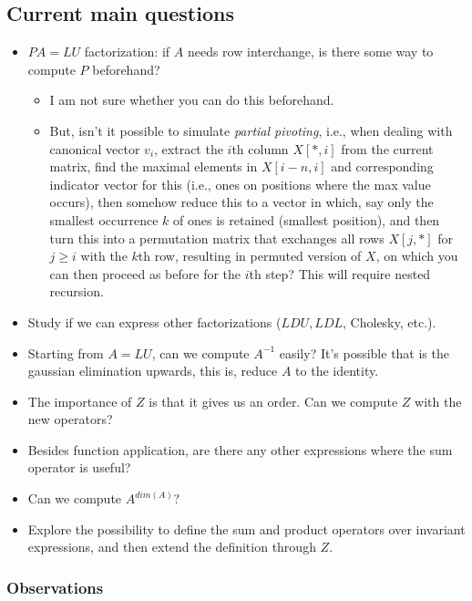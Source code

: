 \subsection*{Current main questions}
\begin{itemize}

\item $PA=LU$ factorization: if $A$ needs row interchange, is there some way to compute $P$ beforehand?
\begin{itemize}
\item I am not sure whether you can do this beforehand.
\item But, isn't it possible to simulate \emph{partial pivoting}, i.e., when dealing with canonical vector $v_i$, extract the $i$th column $X[*,i]$ from the current
matrix, find the maximal elements in $X[i-n,i]$ and corresponding indicator vector for this (i.e., ones on positions where the max value occurs), then somehow
reduce this to a vector in which, say only the smallest occurrence $k$ of ones is retained (smallest position), and then turn this into a permutation matrix that exchanges
all rows $X[j,*]$ for $j\geq i$ with the $k$th row, resulting in permuted version of $X$, on which you can then proceed as before for the $i$th step? This will require nested
recursion.
\end{itemize}
\item Study if we can express other factorizations ($LDU, LDL$,
Cholesky, etc.).
\item Starting from $A=LU$, can we compute $A^{-1}$ easily? It's possible that is the gaussian elimination upwards, this is, reduce $A$ to the identity.
\item The importance of $Z$ is that it gives us an order. Can we compute $Z$ with the new operators?
\item Besides function application, are there any other expressions where the sum operator is useful?
\item Can we compute $A^{dim(A)}$?
\item Explore the possibility to define the sum and product operators over invariant expressions, and then extend the definition through $Z$.

\end{itemize}

\subsubsection*{Observations}

